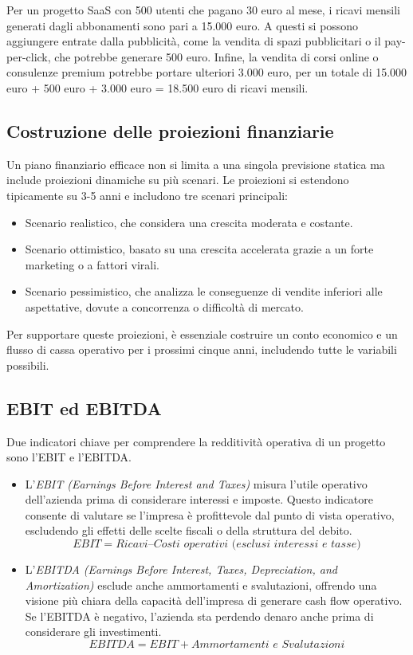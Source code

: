 Per un progetto SaaS con 500 utenti che pagano 30 euro al mese, i ricavi mensili generati dagli abbonamenti sono pari a 15.000 euro. A questi si possono aggiungere entrate dalla pubblicità, come la vendita di spazi pubblicitari o il pay-per-click, che potrebbe generare 500 euro. Infine, la vendita di corsi online o consulenze premium potrebbe portare ulteriori 3.000 euro, per un totale di 15.000 euro + 500 euro + 3.000 euro = 18.500 euro di ricavi mensili.

\subsection{Costruzione delle proiezioni finanziarie}
Un piano finanziario efficace non si limita a una singola previsione statica ma include proiezioni dinamiche su più scenari. Le proiezioni si estendono tipicamente su 3-5 anni e includono tre scenari principali:
\begin{itemize}
    \item Scenario realistico, che considera una crescita moderata e costante.
    \item Scenario ottimistico, basato su una crescita accelerata grazie a un forte marketing o a fattori virali.
    \item Scenario pessimistico, che analizza le conseguenze di vendite inferiori alle aspettative, dovute a concorrenza o difficoltà di mercato.
\end{itemize}
Per supportare queste proiezioni, è essenziale costruire un conto economico e un flusso di cassa operativo per i prossimi cinque anni, includendo tutte le variabili possibili.

\subsection{EBIT ed EBITDA}
Due indicatori chiave per comprendere la redditività operativa di un progetto sono l’EBIT e l’EBITDA.
\begin{itemize}
    \item L’\textit{EBIT (Earnings Before Interest and Taxes)} misura l’utile operativo dell’azienda prima di considerare interessi e imposte. Questo indicatore consente di valutare se l’impresa è profittevole dal punto di vista operativo, escludendo gli effetti delle scelte fiscali o della struttura del debito.
    \begin{equation*}
        \textit{EBIT} = \textit{Ricavi} – \textit{Costi operativi (esclusi interessi e tasse)}
    \end{equation*}
    
    \item L’\textit{EBITDA (Earnings Before Interest, Taxes, Depreciation, and Amortization)} esclude anche ammortamenti e svalutazioni, offrendo una visione più chiara della capacità dell’impresa di generare cash flow operativo. Se l’EBITDA è negativo, l’azienda sta perdendo denaro anche prima di considerare gli investimenti.
    \begin{equation*}
        \textit{EBITDA} = \textit{EBIT} + \textit{Ammortamenti e Svalutazioni}
    \end{equation*}
\end{itemize}

